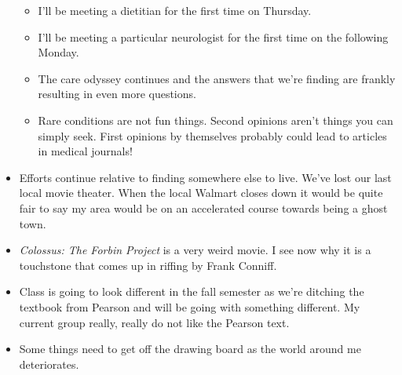 \begin{itemize}
  \begin{itemize}
  \tightlist
  \item
    I'll be meeting a dietitian for the first time on Thursday.
  \item
    I'll be meeting a particular neurologist for the first time on the
    following Monday.
  \item
    The care odyssey continues and the answers that we're finding are
    frankly resulting in even more questions.
  \item
    Rare conditions are not fun things. Second opinions aren't things
    you can simply seek. First opinions by themselves probably could
    lead to articles in medical journals!
  \end{itemize}
\item
  Efforts continue relative to finding somewhere else to live. We've
  lost our last local movie theater. When the local Walmart closes down
  it would be quite fair to say my area would be on an accelerated
  course towards being a ghost town.
\item
  \emph{Colossus: The Forbin Project} is a very weird movie. I see now
  why it is a touchstone that comes up in riffing by Frank Conniff.
\item
  Class is going to look different in the fall semester as we're
  ditching the textbook from Pearson and will be going with something
  different. My current group really, really do not like the Pearson
  text.
\item
  Some things need to get off the drawing board as the world around me
  deteriorates.
\end{itemize}

